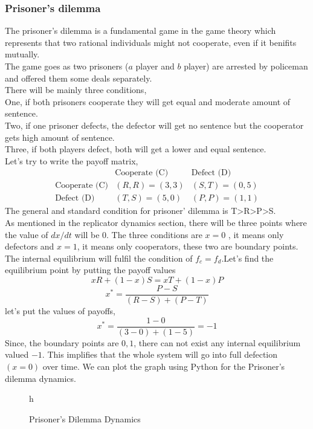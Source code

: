 \documentclass{article}
\begin{document}
\subsubsection{Prisoner's dilemma}
The prisoner's dilemma is a fundamental game in the game theory which represents that two rational individuals might not cooperate, even if it benifits mutually.\\
The game goes as two prisoners ($a$ player and $b$ player) are arrested by policeman and offered them some deals separately.\\
There will be mainly three conditions,\\
One, if both prisoners cooperate they will get equal and moderate amount of sentence.\\
Two, if one prisoner defects, the defector will get no sentence but the cooperator gets high amount of sentence.\\
Three, if both players defect, both will get a lower and equal sentence.\\
Let's try to write the payoff matrix,
\[
\begin{array}{c|cc}
    & \text{Cooperate (C)} & \text{Defect (D)} \\
    \hline
    \text{Cooperate (C)} & (R,R) = (3,3) & (S,T) = (0,5) \\
    \text{Defect (D)} & (T,S) = (5,0) & (P,P) = (1,1)
\end{array}
\]
The general and standard condition for prisoner' dilemma is T>R>P>S.\\
As mentioned in the replicator dynamics section, there will be three points where the value of $dx/dt$ will be $0$. The three conditions are $x=0$ , it means only defectors and $x=1$, it means only cooperators, these two are boundary points.\\
The internal equilibrium will fulfil the condition of $f_c=f_d$.Let's find the equilibrium point by putting the payoff values\\
\[xR+(1-x)S= xT+(1-x)P\]
\[x^*=\frac{P-S}{(R-S)+(P-T)}\]
let's put the values of payoffs,
\[x^*=\frac{1-0}{(3-0)+(1-5)}= -1\]
Since, the boundary points are ${0,1}$, there can not exist any internal equilibrium valued $-1$. This implifies that the whole system will go into full defection $(x=0)$ over time.
We can plot the graph using Python for the Prisoner's dilemma dynamics.\\
\begin{figure}{h}
    \centering
    \caption{Prisoner's Dilemma Dynamics}
    \label{fig: Replicator Dynamics for Prisoner' Dilemma}
\end{figure}
\end{document}
